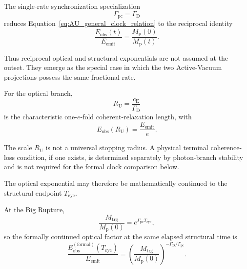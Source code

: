 The single-rate synchronization specialization
\begin{equation}
    \Gamma_{\mathrm{pc}}
    =
    \Gamma_{\mathrm D}
\end{equation}
reduces
Equation~\eqref{eq:AU_general_clock_relation}
to the reciprocal identity
\begin{equation}
    \boxed{
    \frac{
        E_{\mathrm{obs}}(t)
    }{
        E_{\mathrm{emit}}
    }
    =
    \frac{
        M_{\mathrm p}(0)
    }{
        M_{\mathrm p}(t)
    }.
    }
    \label{eq:AU_reciprocal_clock}
\end{equation}

Thus reciprocal optical and structural exponentials are not assumed at the
outset. They emerge as the special case in which the two Active-Vacuum
projections possess the same fractional rate.

For the optical branch,
\begin{equation}
    R_{\mathrm U}
    =
    \frac{
        c_{\mathrm E}
    }{
        \Gamma_{\mathrm D}
    }
\end{equation}
is the characteristic one-\(e\)-fold coherent-relaxation length, with
\begin{equation}
    E_{\mathrm{obs}}(R_{\mathrm U})
    =
    \frac{
        E_{\mathrm{emit}}
    }{
        e
    }.
\end{equation}

The scale
\(R_{\mathrm U}\)
is not a universal stopping radius. A physical terminal coherence-loss
condition, if one exists, is determined separately by photon-branch
stability and is not required for the formal clock comparison below.

The optical exponential may therefore be mathematically continued to the
structural endpoint
\(T_{\mathrm{cyc}}\).

At the Big Rupture,
\begin{equation}
    \frac{
        M_{\mathrm{trg}}
    }{
        M_{\mathrm p}(0)
    }
    =
    e^{\Gamma_{\mathrm{pc}}T_{\mathrm{cyc}}},
\end{equation}
so the formally continued optical factor at the same elapsed structural time
is
\begin{equation}
    \boxed{
    \frac{
        E_{\mathrm{obs}}^{(\mathrm{formal})}
        (T_{\mathrm{cyc}})
    }{
        E_{\mathrm{emit}}
    }
    =
    \left(
        \frac{
            M_{\mathrm{trg}}
        }{
            M_{\mathrm p}(0)
        }
    \right)^{
        -\Gamma_{\mathrm D}/\Gamma_{\mathrm{pc}}
    }.
    }
    \label{eq:AU_endpoint_clock_general}
\end{equation}

